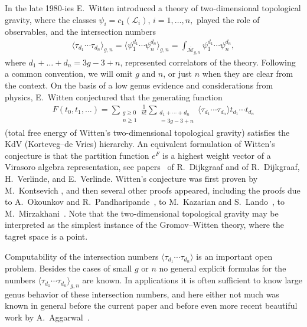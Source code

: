 \documentclass[pdftex]{sigma}
\theoremstyle{definition}
\begin{document}
In the late 1980-ies E.~Witten \cite{Witten} introduced a
theory of two-dimensional topological gravity, where the
classes $\psi_i=c_1(\mathcal{L}_i)$, $i=1,\dots,n,$ played
the role of observables, and the intersection numbers
\begin{gather*}
\langle\tau_{d_1}\cdots\tau_{d_n}\rangle_{g,n}
=\big\langle\psi_1^{d_1}\cdots\psi_n^{d_n}\big\rangle_{g,n}
=\int_{\overline{\mathcal{M}}_{g,n}}
\psi_1^{d_1}\cdots\psi_n^{d_n} ,
\end{gather*}
where $d_1+\dots +d_n=3g-3+n$, represented correlators of
the theory. Following a common convention, we will omit $g$
and $n$, or just $n$ when they are clear from the context.
On the basis of a low genus evidence and considerations
from physics, E.~Witten conjectured that the generating function
\begin{gather*}
F(t_0,t_1,\dots)
=\sum_{\substack{g\geq 0\\n\geq 1}}\frac{1}{n!}
\sum_{\substack{d_1+\cdots+ d_n\\=3g-3+n}}
\langle\tau_{d_1}\cdots\tau_{d_n}\rangle
t_{d_1}\cdots t_{d_n}
\end{gather*}
(total free energy of Witten's two-dimensional topological
gravity) satisfies the KdV (Korteveg--de Vries) hierarchy. An
equivalent formulation of Witten's conjecture is that the
partition function $e^F$ is a highest weight vector of a
Virasoro algebra representation, see papers~\cite{Dij, DVV}
of R.~Dijkgraaf and of R.~Dijkgraaf, H.~Verlinde, and E.~Verlinde. Witten's conjecture was first proven by
M.~Kontsevich \cite{Kontsevich}, and then several other
proofs appeared, including the proofs due to
A.~Okounkov and R.~Pandharipande~\cite{Okounkov:Pandharipande},
to M.~Kazarian and S.~Lando~\cite{Kazarian:Lando},
to M.~Mirzakhani~\cite{Mirzakhani:simple:geodesics:and:volumes,
Mirzakhani:volumes:and:intersection:theory}. Note that the
two-dimensional topological gravity may be interpreted as
the simplest instance of the Gromov--Witten theory, where
the tagret space is a point.

Computability of the intersection numbers
$\langle\tau_{d_1}\cdots\tau_{d_n}\rangle$ is an important
open problem. Besides the cases of small $g$ or $n$ no
general explicit formulas for the numbers
$\langle\tau_{d_1}\cdots\tau_{d_n}\rangle_{g,n}$ are known.
In applications it is often sufficient to know large genus
behavior of these intersection numbers, and here either not
much was known in general before the current paper
and before even more recent beautiful
work by A.~Aggarwal~\cite{Aggarwal:intersection:numbers}.
\end{document}
